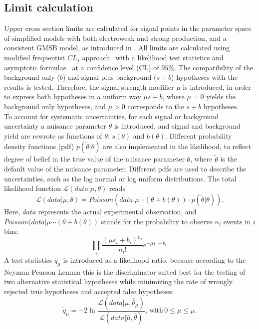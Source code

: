 \subsection{Limit calculation}
Upper cross section limits are calculated for signal points in the parameter space of simplified models with both electroweak and strong production, and a consistent GMSB model, as introduced in . All limits are calculated using modified frequentist $CL_s$ approach~\cite{CLS1,CLS2,CLS3} with a likelihood test statistics and asymptotic formulae~\cite{AsymptoticFormulae} at a confidence level (CL) of $95\%$. The compatibility of the background only ($b$) and signal plus background ($s+b$) hypotheses with the results is tested. Therefore, the signal strength modifier $\mu$ is introduced, in order to express both hypotheses in a uniform way $\mu s+b$, where $\mu=0$ yields the background only hypotheses, and $\mu>0$ corresponds to the $s+b$ hypotheses.\\
To account for systematic uncertainties, for each signal or background uncertainty a nuisance parameter $\theta$ is introduced, and signal and background yield are rewrote as functions of $\theta$: $s(\theta)$ and $b(\theta)$. Different probability density functions (pdf) $p(\tilde{\theta}|\theta)$ are also implemented in the likelihood, to reflect degree of belief in the true value of the nuisance parameter $\theta$, where $\tilde{\theta}$ is the default value of the nuisance parameter. Different pdfs are used to describe the uncertainties, such as the log normal or log uniform distributions. The total likelihood function $\mathcal{L}(data|\mu,\theta)$ reads
\begin{equation}
 \mathcal{L}(data|\mu,\theta)= Poisson(data|\mu\cdots(\theta+b(\theta))\cdot p(\tilde{\theta}|\theta)).
\end{equation}
Here, $data$ represents the actual experimental observation, and $Poisson(data|\mu\cdots(\theta+b(\theta))$ stands for the probability to observe $n_i$ events in $i$ bins:
\begin{equation}
 \prod_i \frac{(\mu s_i+b_i)^{n_i}}{n_i!}e^{-\mu s_i - b_i}.
\end{equation}
A test statistics $\tilde{q_\mu}$ is introduced as a likelihood ratio, because according to the Neyman-Pearson Lemma this is the discriminator suited best for the testing of two alternative statistical hypotheses while minimizing the rate of wrongly rejected true hypotheses and accepted false hypotheses:
\begin{equation}
 \tilde{q}_{\mu}= -2 \ln \frac{\mathcal{L}(data|\mu,\hat{\theta}_{\mu})}{\mathcal{L}(data|\hat{\mu},\hat{\theta})}, \,\mathrm{with}\,0\leq\hat{\mu}\leq\mu.
\end{equation}

